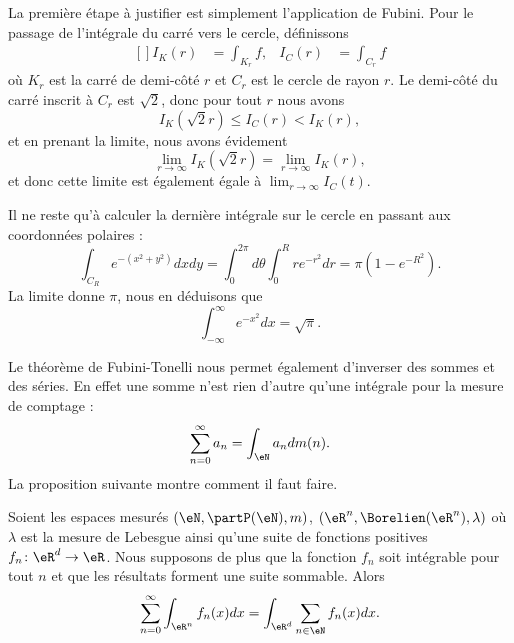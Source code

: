 \begin{example}
\begin{subproof}
		La première étape à justifier est simplement l'application de Fubini. Pour le passage de l'intégrale du carré vers le cercle, définissons
		\begin{equation}
			\begin{aligned}[]
				I_K(r) & =\int_{K_r}f, & I_C(r) & =\int_{C_r}f
			\end{aligned}
		\end{equation}
		où \( K_r\) est la carré de demi-côté \( r\) et \( C_r\) est le cercle de rayon \( r\). Le demi-côté du carré inscrit à \( C_r\) est \( \sqrt{2}\), donc pour tout \( r\) nous avons
		\begin{equation}
			I_K(\sqrt{2}r)\leq I_C(r)<I_K(r),
		\end{equation}
		et en prenant la limite, nous avons évidement
		\begin{equation}
			\lim_{r\to \infty}I_K(\sqrt{2}r)=\lim_{r\to\infty}I_K(r),
		\end{equation}
		et donc cette limite est également égale à \( \lim_{r\to\infty}I_C(t)\).

		Il ne reste qu'à calculer la dernière intégrale sur le cercle en passant aux coordonnées polaires :
		\begin{equation}
			\int_{C_R} e^{-(x^2+y^2)}dxdy=\int_0^{2\pi}d\theta\int_0^Rr e^{-r^2}dr=\pi(1- e^{-R^2}).
		\end{equation}
		La limite donne \( \pi\), nous en déduisons que
		\begin{equation}    \label{EqFDvHTg}
			\int_{-\infty}^{\infty} e^{-x^2}dx=\sqrt{\pi}.
		\end{equation}
	\end{subproof}

\end{example}

Le théorème de Fubini-Tonelli nous permet également d'inverser des sommes et des séries. En effet une somme n'est rien d'autre qu'une intégrale pour la mesure de comptage :
\begin{equation}
	\sum_{n=0}^{\infty}a_n=\int_{\eN}a_ndm(n).
\end{equation}
La proposition suivante montre comment il faut faire.

\begin{proposition}\label{PropInversSumIntFub}
	Soient les espaces mesurés \( (\eN,\partP(\eN),m)\), \( (\eR^n,\Borelien(\eR^n),\lambda)\) où \( \lambda\) est la mesure de Lebesgue ainsi qu'une suite de fonctions positives \( f_n\colon \eR^d\to \eR\). Nous supposons de plus que la fonction \( f_n\) soit intégrable pour tout \( n\) et que les résultats forment une suite sommable. Alors
	\begin{equation}
		\sum_{n=0}^{\infty}\int_{\eR^n}f_n(x)dx=\int_{\eR^d}\sum_{n\in \eN}f_n(x)dx.
	\end{equation}
\end{proposition}

